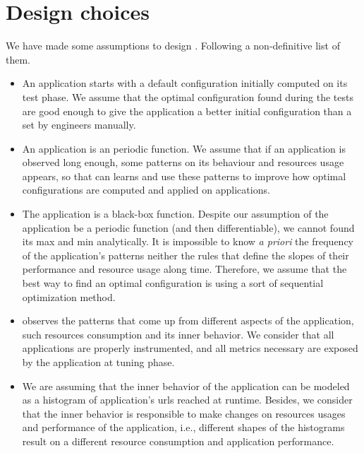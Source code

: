 \section{Design choices} \label{sec:design.choices}


We have made some assumptions to design \name. Following a non-definitive list
of them.

\begin{itemize}

\item An application starts with a default configuration initially computed on
  its test phase. We assume that the optimal configuration found during the
    tests are good enough to give the application a better initial configuration
    than a set by engineers manually.

\item An application is an periodic function. We assume that if an application
  is observed long enough, some patterns on its behaviour and resources usage
    appears, so that \name can learns and use these patterns to improve how
    optimal configurations are computed and applied on applications.

\item The application is a black-box function. Despite our assumption of the
  application be a periodic function (and then differentiable), we cannot found
    its max and min analytically. It is impossible to know \textit{a priori} the
    frequency of the application's patterns neither the rules that define the
    slopes of their performance and resource usage along time. Therefore, we
    assume that the best way to find an optimal configuration is using a sort of
    sequential optimization method.

\item \name observes the patterns that come up from different aspects of the
  application, such resources consumption and its inner behavior. We consider
    that all applications are properly instrumented, and all metrics necessary
    are exposed by the application at tuning phase.

\item We are assuming that the inner behavior of the application can be modeled
  as a histogram of application's urls reached at runtime. Besides, we consider
    that the inner behavior is responsible to make changes on resources usages
    and performance of the application, i.e., different shapes of the histograms
    result on a different resource consumption and application performance.


\end{itemize}
